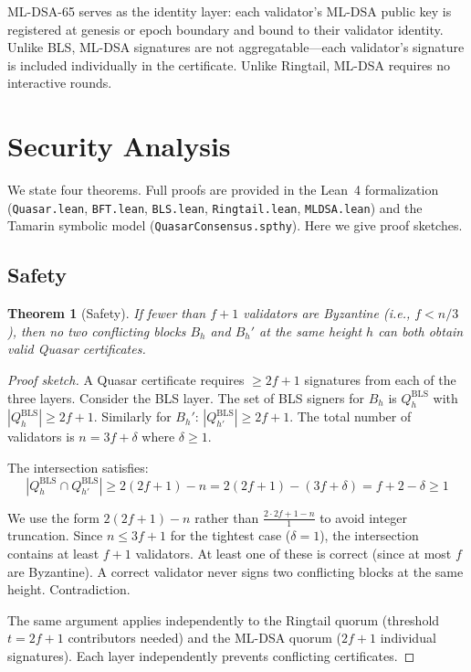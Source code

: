\documentclass[11pt,a4paper]{article}
\newtheorem{theorem}{Theorem}[section]
\begin{document}
ML-DSA-65 serves as the identity layer: each validator's ML-DSA public key is
registered at genesis or epoch boundary and bound to their validator identity.
Unlike BLS, ML-DSA signatures are not aggregatable---each validator's signature
is included individually in the certificate. Unlike Ringtail, ML-DSA requires
no interactive rounds.


\section{Security Analysis}
\label{sec:security}

We state four theorems. Full proofs are provided in the Lean~4 formalization
(\texttt{Quasar.lean}, \texttt{BFT.lean}, \texttt{BLS.lean},
\texttt{Ringtail.lean}, \texttt{MLDSA.lean}) and the Tamarin symbolic model
(\texttt{QuasarConsensus.spthy}). Here we give proof sketches.

\subsection{Safety}

\begin{theorem}[Safety]
\label{thm:safety}
If fewer than $f+1$ validators are Byzantine (i.e., $f < n/3$), then no two
conflicting blocks $B_h$ and $B_h'$ at the same height $h$ can both obtain
valid Quasar certificates.
\end{theorem}

\begin{proof}[Proof sketch]
A Quasar certificate requires $\geq 2f+1$ signatures from each of the three
layers. Consider the BLS layer. The set of BLS signers for $B_h$ is
$Q^{\mathrm{BLS}}_h$ with $|Q^{\mathrm{BLS}}_h| \geq 2f+1$. Similarly for
$B_h'$: $|Q^{\mathrm{BLS}}_{h'}| \geq 2f+1$. The total number of validators
is $n = 3f + \delta$ where $\delta \geq 1$.

The intersection satisfies:
\[
|Q^{\mathrm{BLS}}_h \cap Q^{\mathrm{BLS}}_{h'}| \geq
2(2f+1) - n = 2(2f+1) - (3f+\delta) = f + 2 - \delta \geq 1
\]

We use the form $2(2f+1) - n$ rather than $\frac{2 \cdot 2f+1 - n}{1}$ to
avoid integer truncation. Since $n \leq 3f+1$ for the tightest case
($\delta = 1$), the intersection contains at least $f+1$ validators. At least
one of these is correct (since at most $f$ are Byzantine). A correct validator
never signs two conflicting blocks at the same height. Contradiction.

The same argument applies independently to the Ringtail quorum (threshold
$t = 2f+1$ contributors needed) and the ML-DSA quorum ($2f+1$ individual
signatures). Each layer independently prevents conflicting certificates.
\end{proof}
\end{document}
